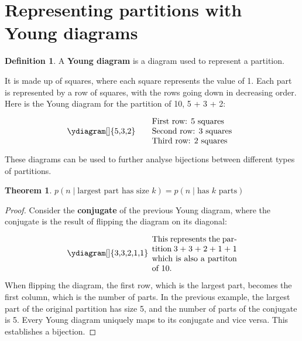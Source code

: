 \documentclass{article}
\theoremstyle{definition}
\newtheorem{definition}{Definition}
\newtheorem{theorem}{Theorem}
\begin{document}
\newpage

\section{Representing partitions with Young diagrams}

\begin{definition}
    A \textbf{Young diagram} is a diagram used to represent a partition.
\end{definition}

\noindent
It is made up of squares, where each square represents
the value of 1. Each part is represented by a row of squares, with the rows going down in decreasing order.
\newline Here is the Young diagram for the partition of 10, 5 + 3 + 2:

\[
\begin{minipage}{0.3\textwidth}
    \ydiagram[]
        {5,3,2}
\end{minipage}
\begin{minipage}{0.3\textwidth}
    First row: 5 squares \\
    Second row: 3 squares \\
    Third row: 2 squares
\end{minipage}
\]

\noindent
These diagrams can be used to further analyse bijections between different types of partitions.

\begin{theorem}
    $p(n \mid \text{largest part has size $k$}) = p(n \mid \text{has $k$ parts})$
\end{theorem}

\begin{proof}
Consider the \textbf{conjugate} of the previous Young diagram, where the conjugate is the result of
flipping the diagram on its diagonal:

\[
\begin{minipage}{0.3\textwidth}
    \ydiagram[]
        {3,3,2,1,1}
\end{minipage}
\begin{minipage}{0.3\textwidth}
    This represents the partition 3 + 3 + 2 + 1 + 1 which is also a partiton of 10.
\end{minipage}
\]

\noindent
When flipping the diagram, the first row, which is the largest part, becomes the first column, which is the
number of parts. In the previous example, the largest part of the original partition has size 5, and the number of
parts of the conjugate is 5.
\newline Every Young diagram uniquely maps to its conjugate and vice versa. This establishes a bijection.
\end{proof}
\end{document}
